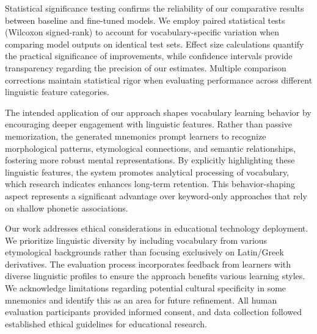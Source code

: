 Statistical significance testing confirms the reliability of our comparative results between baseline and fine-tuned models. We employ paired statistical tests (Wilcoxon signed-rank) to account for vocabulary-specific variation when comparing model outputs on identical test sets. Effect size calculations quantify the practical significance of improvements, while confidence intervals provide transparency regarding the precision of our estimates. Multiple comparison corrections maintain statistical rigor when evaluating performance across different linguistic feature categories.

 The intended application of our approach shapes vocabulary learning behavior by encouraging deeper engagement with linguistic features. Rather than passive memorization, the generated mnemonics prompt learners to recognize morphological patterns, etymological connections, and semantic relationships, fostering more robust mental representations. By explicitly highlighting these linguistic features, the system promotes analytical processing of vocabulary, which research indicates enhances long-term retention. This behavior-shaping aspect represents a significant advantage over keyword-only approaches that rely on shallow phonetic associations.

 Our work addresses ethical considerations in educational technology deployment. We prioritize linguistic diversity by including vocabulary from various etymological backgrounds rather than focusing exclusively on Latin/Greek derivatives. The evaluation process incorporates feedback from learners with diverse linguistic profiles to ensure the approach benefits various learning styles. We acknowledge limitations regarding potential cultural specificity in some mnemonics and identify this as an area for future refinement. All human evaluation participants provided informed consent, and data collection followed established ethical guidelines for educational research.
